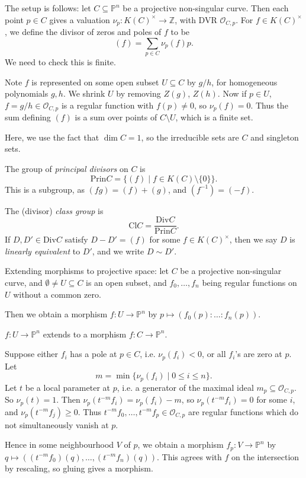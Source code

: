 \documentclass[12pt]{article}
\begin{document}
The setup is follows: let $C \subseteq \mathbb{P}^n$ be a projective non-singular curve. Then each point $p \in C$ gives a valuation $\nu_p : K(C)^\times \to \mathbb{Z}$, with DVR $\mathcal{O}_{C, p}$. For $f \in K(C)^\times$, we define the divisor of zeros and poles of $f$ to be
\[
	(f) = \sum_{p \in C} \nu_p(f) p.
\]
We need to check this is finite.

Note $f$ is represented on some open subset $U \subseteq C$ by $g/h$, for homogeneous polynomials $g, h$. We shrink $U$ by removing $Z(g)$, $Z(h)$. Now if $p \in U$, $f = g/h \in \mathcal{O}_{C, p}$ is a regular function with $f(p) \neq 0$, so $\nu_p(f) = 0$. Thus the sum defining $(f)$ is a sum over points of $C \setminus U$, which is a finite set.

Here, we use the fact that $\dim C = 1$, so the irreducible sets are $C$ and singleton sets.

\begin{definition}
	The group of \emph{principal divisors} on $C$ is
	\[
		\mathrm{Prin} C = \{(f) \mid f \in K(C) \setminus \{0\}\}.
	\]
	This is a subgroup, as $(fg) = (f) + (g)$, and $(f^{-1}) = (-f)$.

	The (divisor) \emph{class group} is
	\[
	\mathrm{Cl} C = \frac{\mathrm{Div} C}{\mathrm{Prin} C}.
	\]
	If $D, D' \in \mathrm{Div} C$ satisfy $D - D' = (f)$ for some $f \in K(C)^\times$, then we say $D$ is \emph{linearly equivalent} to $D'$, and we write $D \sim D'$.
\end{definition}

Extending morphisms to projective space: let $C$ be a projective non-singular curve, and $\emptyset \neq U \subseteq C$ is an open subset, and $f_0, \ldots, f_n$ being regular functions on $U$ without a common zero.

Then we obtain a morphism $f : U \to \mathbb{P}^n$ by $p \mapsto (f_0(p): \ldots: f_n(p))$.

\begin{theorem}
	$f : U \to \mathbb{P}^n$ extends to a morphism $f : C \to \mathbb{P}^n$.
\end{theorem}

\begin{proofbox}
	Suppose either $f_i$ has a pole at $p \in C$, i.e. $\nu_p(f_i) < 0$, or all $f_i$'s are zero at $p$. Let
	\[
		m = \min \{\nu_p(f_i) \mid 0 \leq i \leq n\}.
	\]
	Let $t$ be a local parameter at $p$, i.e. a generator of the maximal ideal $m_p \subseteq \mathcal{O}_{C, p}$. So $\nu_p(t) = 1$. Then $\nu_p(t^{-m} f_i) = \nu_p(f_i) - m$, so $\nu_p(t^{-m} f_i) = 0$ for some $i$, and $\nu_p(t^{-m} f_j) \geq 0$. Thus $t^{-m} f_0, \ldots, t^{-m} f_p \in \mathcal{O}_{C, p}$ are regular functions which do not simultaneously vanish at $p$.

	Hence in some neighbourhood $V$ of $p$, we obtain a morphism $f_p : V \to \mathbb{P}^n$ by $q \mapsto ((t^{-m} f_0)(q), \ldots, (t^{-m} f_n)(q))$. This agrees with $f$ on the intersection by rescaling, so gluing gives a morphism.
\end{proofbox}
\end{document}
